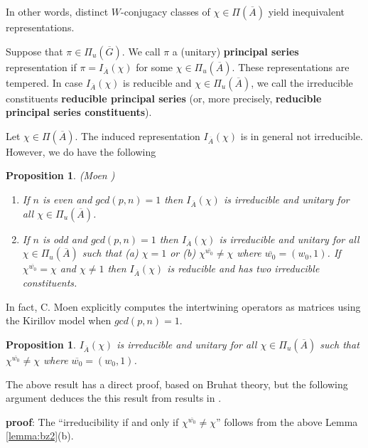 \documentclass[twocolumn,10pt]{article}
\newtheorem{proposition}[theorem]{Proposition}
\begin{document}
In other words, distinct $W$-conjugacy classes of
$\chi \in \Pi (\overline{A})$ yield
inequivalent representations.

Suppose that $\pi \in \Pi _u(\overline{G})$. We call 
$\pi $ a (unitary) 
{\bf principal series} representation if $\pi =
I_{\overline{A}}(\chi )$ for some $\chi \in \Pi _u(\overline{A})$. 
These representations are tempered. In case $I_{\overline{A}}(\chi )$
is reducible and $\chi \in \Pi _u(\overline{A})$, we call the
irreducible constituents {\bf reducible principal series}
(or, more precisely, {\bf reducible principal series constituents}).

Let $\chi \in \Pi (\overline{A})$. The induced representation
$I_{\overline{A}}(\chi )$ is in general not irreducible. 
However, we do have the
following

\begin{proposition}
(Moen \cite{Mo2}) 
\begin{enumerate}
\item[(a)]
If $n$ is even and $gcd(p,n)=1$ then 
$I_{\overline{A}}(\chi )$ is
irreducible and unitary for all $\chi \in \Pi _u(\overline{A})$.
\item[(b)]
If $n$ is odd and $gcd(p,n)=1$ then $I_{\overline{A}}(\chi )$ is
irreducible and unitary for all $\chi \in \Pi _u(\overline{A})$ such that 
(a) $\chi =1$ or (b) 
$\chi^{\overline{w_0}}\neq \chi $ where $\overline{w_0}=(w_0 ,1)$. 
If $\chi^{\overline{w_0}}=\chi $ and $\chi\not= 1$ 
then $I_{\overline{A}}(\chi )$ is 
reducible and has two irreducible constituents.
\end{enumerate}
\end{proposition}

In fact, C. Moen \cite{Mo1}
explicitly computes the intertwining operators as
matrices using the Kirillov model when $gcd(p,n)=1$. 

\begin{proposition}
$I_{\overline{A}}(\chi )$ is
irreducible and unitary for all $\chi \in \Pi _u(\overline{A})$
such that 
$\chi^{\overline{w_0}}\neq \chi $ where $\overline{w_0}=(w_0 ,1)$. 
\label{prop:moen}
\end{proposition}

The above result has a direct proof, based on Bruhat theory,
but the following argument deduces the this result from
results in \cite{FK}. 

{\bf proof}: The ``irreducibility if and only if
$\chi^{\overline{w_0}}\neq \chi $'' follows from the
above Lemma \ref{lemma:bz2}(b).
\end{document}

